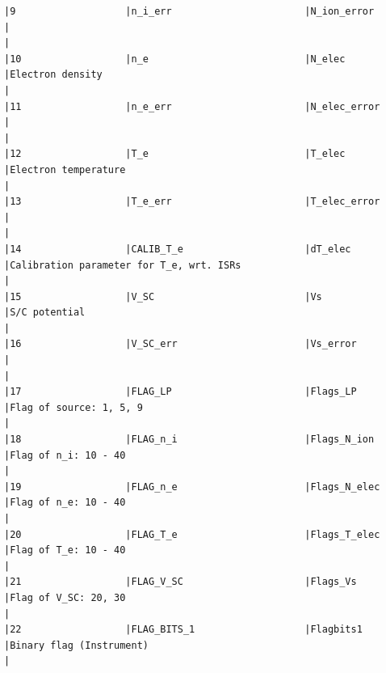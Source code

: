 \begin{verbatim}
|9                   |n_i_err                       |N_ion_error                   |                                                                                                    |
|10                  |n_e                           |N_elec                        |Electron density                                                                                    |
|11                  |n_e_err                       |N_elec_error                  |                                                                                                    |
|12                  |T_e                           |T_elec                        |Electron temperature                                                                                |
|13                  |T_e_err                       |T_elec_error                  |                                                                                                    |
|14                  |CALIB_T_e                     |dT_elec                       |Calibration parameter for T_e, wrt. ISRs                                                            |
|15                  |V_SC                          |Vs                            |S/C potential                                                                                       |
|16                  |V_SC_err                      |Vs_error                      |                                                                                                    |
|17                  |FLAG_LP                       |Flags_LP                      |Flag of source: 1, 5, 9                                                                             |
|18                  |FLAG_n_i                      |Flags_N_ion                   |Flag of n_i: 10 - 40                                                                                |
|19                  |FLAG_n_e                      |Flags_N_elec                  |Flag of n_e: 10 - 40                                                                                |
|20                  |FLAG_T_e                      |Flags_T_elec                  |Flag of T_e: 10 - 40                                                                                |
|21                  |FLAG_V_SC                     |Flags_Vs                      |Flag of V_SC: 20, 30                                                                                |
|22                  |FLAG_BITS_1                   |Flagbits1                     |Binary flag (Instrument)                                                                            |

\end{verbatim}

